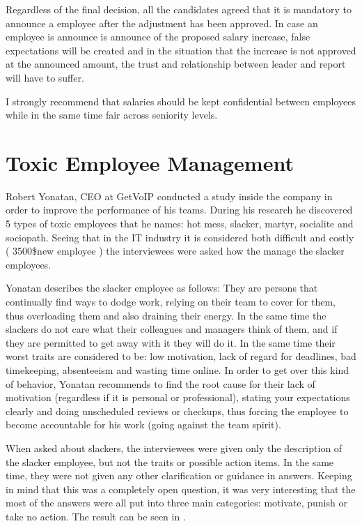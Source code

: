 Regardless of the final decision, all the candidates agreed that it is mandatory to announce a employee after the adjustment has been approved. In case an employee is announce is announce of the proposed salary increase, false expectations will be created and in the situation that the increase is not approved at the announced amount, the trust and relationship between leader and report will have to suffer. 

I strongly recommend that salaries should be kept confidential between employees while in the same time fair across seniority levels.

\section{Toxic Employee Management}
\label{sec:toxic}
Robert Yonatan, CEO at GetVoIP conducted a study inside the company in order to improve the performance of his teams. During his research \cite{toxic} he discovered 5 types of toxic employees that he names: hot mess, slacker, martyr, socialite and sociopath. Seeing that in the IT industry it is considered both difficult and costly ( 3500\$new employee \cite{cost-replace}) the interviewees were asked how the manage the slacker employees.

Yonatan describes the slacker employee as follows: They are persons that continually find ways to dodge work, relying on their team to cover for them, thus overloading them and also draining their energy. In the same time the slackers do not care what their colleagues and managers think of them, and if they are permitted to get away with it they will do it. In the same time their worst traits are considered to be: low motivation, lack of regard for deadlines, bad timekeeping, absenteeism and wasting time online. In order to get over this kind of behavior, Yonatan recommends to find the root cause for their lack of motivation (regardless if it is personal or professional), stating your expectations clearly and doing unscheduled reviews or checkups, thus forcing the employee to become accountable for his work (going against the team spirit).

When asked about slackers, the interviewees were given only the description of the slacker employee, but not the traits or possible action items. In the same time, they were not given any other clarification or guidance in answers. Keeping in mind that this was a completely open question, it was very interesting that the most of the answers were all put into three main categories: motivate, punish or take no action. The result can be seen in .

